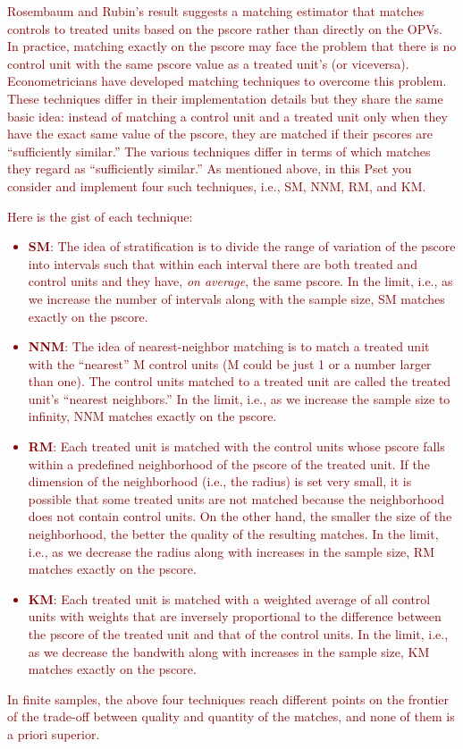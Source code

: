 \documentclass{article}
\begin{document}
\noindent \textcolor{Maroon}{Rosembaum and Rubin's result suggests a matching estimator that matches controls to treated units based on the pscore rather than directly on the OPVs. In practice, matching exactly on the pscore may face the problem that there is no control unit with the same pscore value as a treated unit's (or viceversa). Econometricians have developed matching techniques to overcome this problem. These techniques differ in their implementation details but they share the same basic idea: instead of matching a control unit and a treated unit only when they have the exact same value of the pscore, they are matched if their pscores are ``sufficiently similar.'' The various techniques differ in terms of which matches they regard as ``sufficiently similar.'' As mentioned above, in this Pset you consider and implement four such techniques, i.e., SM, NNM, RM, and KM.} \\

\noindent \textcolor{Maroon}{Here is the gist of each technique: 
\begin{itemize}
\item \textbf{SM}: The idea of stratification is to divide the range of variation of the pscore into intervals such that within each interval there are both treated and control units and they have, \textit{on average}, the same pscore. In the limit, i.e., as we increase the number of intervals along with the sample size, SM matches exactly on the pscore. \item \textbf{NNM}: The idea of nearest-neighbor matching is to match a treated unit with the ``nearest'' M control units (M could be just 1 or a number larger than one). The control units matched to a treated unit are called the treated unit's ``nearest neighbors.'' In the limit, i.e., as we increase the sample size to infinity, NNM matches exactly on the pscore. 
\item \textbf{RM}: Each treated unit is matched with the control units whose pscore falls within a predefined neighborhood of the pscore of the treated unit. If the dimension of the neighborhood (i.e., the radius) is set very small, it is possible that some treated units are not matched because the neighborhood does not contain control units. On the other hand, the smaller the size of the neighborhood, the better the quality of the resulting matches. In the limit, i.e., as we decrease the radius along with increases in the sample size, RM matches exactly on the pscore. 
\item \textbf{KM}: Each treated unit is matched with a weighted average of all control units with weights that are inversely proportional to the difference between the pscore of the treated unit and that of the control units. In the limit, i.e., as we decrease the bandwith along with increases in the sample size, KM matches exactly on the pscore.
\end{itemize}
 In finite samples, the above four techniques reach different points on the frontier of the trade-off between quality and quantity of the matches, and none of them is a priori superior.}
\end{document}
